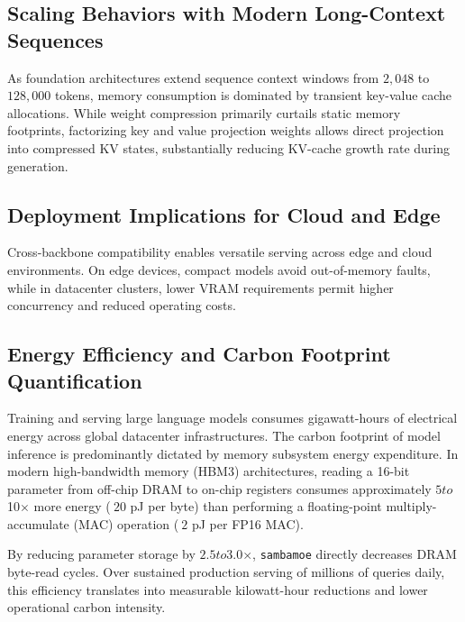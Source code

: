\subsection{Scaling Behaviors with Modern Long-Context Sequences}
As foundation architectures extend sequence context windows from $2{,}048$ to $128{,}000$ tokens, memory consumption is dominated by transient key-value cache allocations. While weight compression primarily curtails static memory footprints, factorizing key and value projection weights allows direct projection into compressed KV states, substantially reducing KV-cache growth rate during generation.

\subsection{Deployment Implications for Cloud and Edge}
Cross-backbone compatibility enables versatile serving across edge and cloud environments. On edge devices, compact models avoid out-of-memory faults, while in datacenter clusters, lower VRAM requirements permit higher concurrency and reduced operating costs.

\subsection{Energy Efficiency and Carbon Footprint Quantification}
Training and serving large language models consumes gigawatt-hours of electrical energy across global datacenter infrastructures. The carbon footprint of model inference is predominantly dictated by memory subsystem energy expenditure. In modern high-bandwidth memory (HBM3) architectures, reading a 16-bit parameter from off-chip DRAM to on-chip registers consumes approximately $5$\times$ to $10$\times$ more energy ($~20$ pJ per byte) than performing a floating-point multiply-accumulate (MAC) operation ($~2$ pJ per FP16 MAC).

By reducing parameter storage by $2.5$\times$ to $3.0$\times$, \texttt{sambamoe} directly decreases DRAM byte-read cycles. Over sustained production serving of millions of queries daily, this efficiency translates into measurable kilowatt-hour reductions and lower operational carbon intensity.
